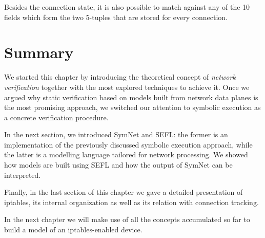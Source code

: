 Besides the connection state, it is also possible to match against any of the
10 fields which form the two 5-tuples that are stored for every connection.


\section{Summary}

We started this chapter by introducing the theoretical concept of \emph{network
verification} together with the most explored techniques to achieve it.  Once
we argued why static verification based on models built from network data
planes is the most promising approach, we switched our attention to symbolic
execution as a concrete verification procedure.

In the next section, we introduced SymNet and SEFL: the former is an
implementation of the previously discussed symbolic execution approach, while
the latter is a modelling language tailored for network processing.  We showed
how models are built using SEFL and how the output of SymNet can be
interpreted.

Finally, in the last section of this chapter we gave a detailed presentation of
iptables, its internal organization as well as its relation with connection
tracking.

In the next chapter we will make use of all the concepts accumulated so far to
build a model of an iptables-enabled device.
